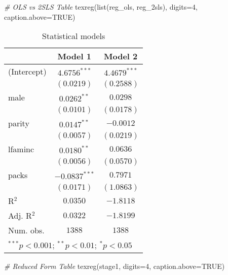 \documentclass[
]{article}
\newenvironment{Shaded}{\begin{snugshade}}{\end{snugshade}}
\newcommand{\AttributeTok}[1]{\textcolor[rgb]{0.77,0.63,0.00}{#1}}
\newcommand{\CommentTok}[1]{\textcolor[rgb]{0.56,0.35,0.01}{\textit{#1}}}
\newcommand{\ConstantTok}[1]{\textcolor[rgb]{0.00,0.00,0.00}{#1}}
\newcommand{\DecValTok}[1]{\textcolor[rgb]{0.00,0.00,0.81}{#1}}
\newcommand{\FunctionTok}[1]{\textcolor[rgb]{0.00,0.00,0.00}{#1}}
\newcommand{\NormalTok}[1]{#1}
\begin{document}
\begin{Shaded}
\begin{Highlighting}[]
\CommentTok{\# OLS vs 2SLS  Table}
\FunctionTok{texreg}\NormalTok{(}\FunctionTok{list}\NormalTok{(reg\_ols, reg\_2sls), }\AttributeTok{digits=}\DecValTok{4}\NormalTok{, }\AttributeTok{caption.above=}\ConstantTok{TRUE}\NormalTok{)}
\end{Highlighting}
\end{Shaded}

\begin{table}
\caption{Statistical models}
\begin{center}
\begin{tabular}{l c c}
\hline
 & Model 1 & Model 2 \\
\hline
(Intercept) & $4.6756^{***}$  & $4.4679^{***}$ \\
            & $(0.0219)$      & $(0.2588)$     \\
male        & $0.0262^{**}$   & $0.0298$       \\
            & $(0.0101)$      & $(0.0178)$     \\
parity      & $0.0147^{**}$   & $-0.0012$      \\
            & $(0.0057)$      & $(0.0219)$     \\
lfaminc     & $0.0180^{**}$   & $0.0636$       \\
            & $(0.0056)$      & $(0.0570)$     \\
packs       & $-0.0837^{***}$ & $0.7971$       \\
            & $(0.0171)$      & $(1.0863)$     \\
\hline
R$^2$       & $0.0350$        & $-1.8118$      \\
Adj. R$^2$  & $0.0322$        & $-1.8199$      \\
Num. obs.   & $1388$          & $1388$         \\
\hline
\multicolumn{3}{l}{\scriptsize{$^{***}p<0.001$; $^{**}p<0.01$; $^{*}p<0.05$}}
\end{tabular}
\label{table:coefficients}
\end{center}
\end{table}

\begin{Shaded}
\begin{Highlighting}[]
\CommentTok{\# Reduced Form Table}
\FunctionTok{texreg}\NormalTok{(stage1, }\AttributeTok{digits=}\DecValTok{4}\NormalTok{, }\AttributeTok{caption.above=}\ConstantTok{TRUE}\NormalTok{)}
\end{Highlighting}
\end{Shaded}
\end{document}
